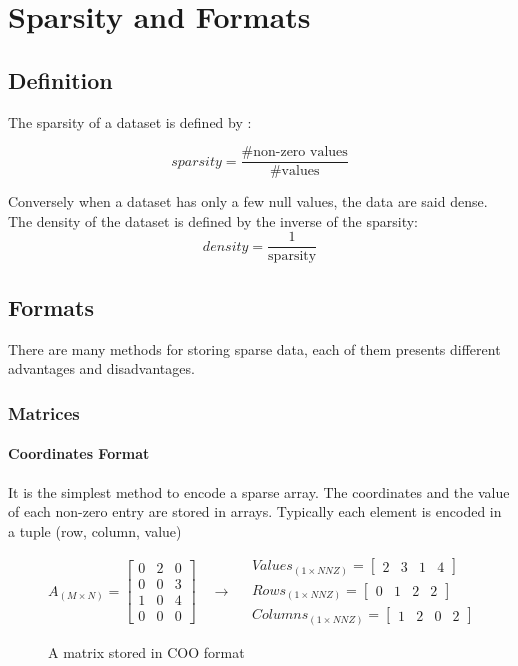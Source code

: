 \chapter{Sparsity and Formats}
\section{Definition}


The sparsity of a dataset is defined by :

\begin{equation}\label{eqn:sparsity}
sparsity = \frac{\text{\# non-zero values}}{\text{\# values}}
\end{equation}

Conversely when a dataset has only a few null values, the data are said dense. The density of the dataset is defined by the inverse of the sparsity:
\begin{equation}\label{eqn:density}
density = \frac{1}{\text{sparsity}}
\end{equation}

\section{Formats}

There are many methods for storing sparse data, each of them presents different advantages and disadvantages.

\subsection{Matrices}
\subsubsection{Coordinates Format}

It is the simplest method to encode a sparse array. The coordinates and the value of each non-zero entry are stored in arrays.
Typically each element is encoded in a tuple (row, column, value)


\begin{figure}[h]
	\[
	A_{(M\times N)} = 
	\begin{bmatrix}
	0 &  2 & 0 \\
	0 &  0 & 3 \\
	1 &  0 & 4\\
	0 &  0 & 0
	\end{bmatrix}
	\quad\rightarrow\quad
	\begin{aligned}
	Values_{(1\times NNZ)} = 
	\begin{bmatrix}
	2 &  3 & 1 & 4
	\end{bmatrix}
	\\
	Rows_{(1\times NNZ)} = 
	\begin{bmatrix}
	0 &  1 & 2 & 2
	\end{bmatrix}
	\\
	Columns_{(1\times NNZ)} = 
	\begin{bmatrix}
	1 &  2 & 0 & 2
	\end{bmatrix}
	\end{aligned}
	\]
	\caption{A matrix stored in COO format}
	\label{fig:cooformat}
\end{figure}

